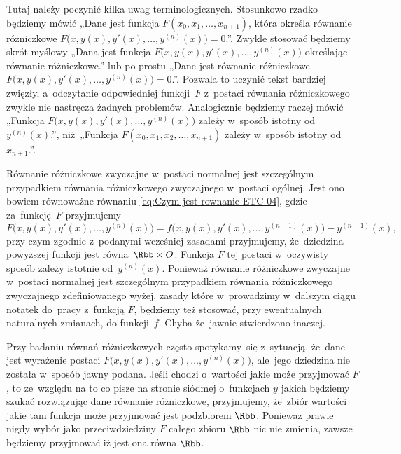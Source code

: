 \documentclass[a4paper,11pt]{article}
\numberwithin{equation}{section}
\begin{document}
Tutaj należy poczynić kilka uwag terminologicznych. Stosunkowo rzadko
będziemy mówić „Dane jest funkcja $F( x_{ 0 }, x_{ 1 }, \ldots, x_{ n + 1 } )$,
która określa równanie różniczkowe
$F\big( x, y( x ), y'( x ), \ldots, y^{ ( n ) }( x ) \big) = 0$.”. Zwykle
stosować będziemy skrót myślowy „Dana jest funkcja
$F\big( x, y( x ), y'( x ), \ldots, y^{ ( n ) }( x ) \big)$ określając równanie
różniczkowe.” lub po prostu „Dane jest równanie różniczkowe
$F\big( x, y( x ), y'( x ), \ldots, y^{ ( n ) }( x ) \big) = 0$.”. Pozwala
to uczynić tekst bardziej zwięzły, a~odczytanie odpowiedniej funkcji~$F$
z~postaci równania różniczkowego zwykle nie nastręcza żadnych problemów.
Analogicznie będziemy raczej mówić „Funkcja
$F\big( x, y( x ), y'( x ), \ldots, y^{ ( n ) }( x ) \big)$ zależy w~sposób
istotny od $y^{ ( n ) }( x )$.”, niż~„Funkcja
$F( x_{ 0 }, x_{ 1 }, x_{ 2 }, \ldots, x_{ n + 1 } )$ zależy w~sposób istotny
od~$x_{ n + 1 }$.”.

Równanie różniczkowe zwyczajne w~postaci normalnej jest
szczególnym przypadkiem równania różniczkowego zwyczajnego w~postaci
ogólnej. Jest ono bowiem równoważne równaniu
\eqref{eq:Czym-jest-rownanie-ETC-04}, gdzie za~funkcję~$F$
przyjmujemy
\begin{equation}
  \label{eq:Czym-jest-rownanie-ETC-06}
  F\big( x, y( x ), y'( x ), \ldots, y^{ ( n ) }( x ) \big) =
  f\big( x, y( x ), y'( x ), \ldots, y^{ ( n - 1 ) }( x ) \big) -
  y^{ ( n - 1 ) }( x ),
\end{equation}
przy czym zgodnie z~podanymi wcześniej zasadami przyjmujemy, że~dziedzina
powyższej funkcji jest równa~$\Rbb \times O$. Funkcja $F$ tej postaci w~oczywisty
sposób zależy istotnie od~$y^{ ( n ) }( x )$. Ponieważ równanie różniczkowe
zwyczajne w~postaci normalnej jest szczególnym przypadkiem równania
różniczkowego zwyczajnego zdefiniowanego wyżej, zasady które w~prowadzimy
w~dalszym ciągu notatek do~pracy z~funkcją $F$, będziemy też stosować, przy
ewentualnych naturalnych zmianach, do funkcji~$f$. Chyba że~jawnie
stwierdzono inaczej.

Przy badaniu równań różniczkowych często spotykamy~się z~sytuacją, że~dane
jest wyrażenie postaci
$F\big( x, y( x ), y'( x ), \ldots, y^{ ( n ) }( x ) \big)$,
ale~jego dziedzina nie została w~sposób jawny podana. Jeśli chodzi
o~wartości jakie może przyjmować $F$, to ze~względu na to co pisze na
stronie siódmej o~funkcjach $y$ jakich będziemy szukać rozwiązując dane
równanie różniczkowe, przyjmujemy, że~zbiór wartości jakie tam funkcja może
przyjmować jest podzbiorem $\Rbb$. Ponieważ prawie nigdy wybór jako
przeciwdziedziny $F$ całego zbioru $\Rbb$ nic nie zmienia, zawsze będziemy
przyjmować iż jest ona równa $\Rbb$.
\end{document}

